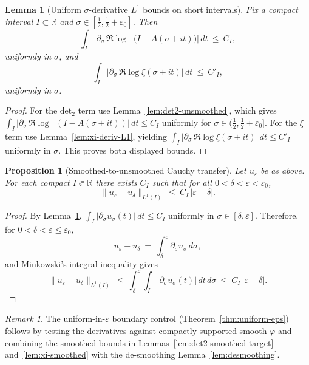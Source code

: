 \documentclass[11pt]{article}
\newtheorem{proposition}[theorem]{Proposition}
\newtheorem{lemma}[theorem]{Lemma}
\theoremstyle{definition}
\theoremstyle{remark}
\newtheorem{remark}[theorem]{Remark}
\newcommand{\R}{\mathbb{R}}
\DeclareMathOperator{\dettwo}{det_2}
\begin{document}
\begin{lemma}[Uniform \(\sigma\)-derivative $L^1$ bounds on short intervals]\label{lem:uniform-derivative-L1}
Fix a compact interval \(I\subset\R\) and \(\sigma\in[\tfrac12,\tfrac12+\varepsilon_0]\). Then
\[
 \int_I \Big|\partial_\sigma\,\Re\log\dettwo\big(I-A(\sigma+it)\big)\Big|\,dt\ \le\ C_I,
\]
uniformly in \(\sigma\), and
\[
 \int_I \Big|\partial_\sigma\,\Re\log\xi(\sigma+it)\Big|\,dt\ \le\ C'_I,
\]
uniformly in \(\sigma\).
\end{lemma}
\begin{proof}
For the det$_2$ term use Lemma~\ref{lem:det2-unsmoothed}, which gives
\(\int_I |\partial_\sigma\,\Re\log\dettwo(I-A(\sigma+it))|\,dt\le C_I\) uniformly for \(\sigma\in(\tfrac12,\tfrac12+\varepsilon_0]\).
For the \(\xi\) term use Lemma~\ref{lem:xi-deriv-L1}, yielding \(\int_I |\partial_\sigma\,\Re\log\xi(\sigma+it)|\,dt\le C'_I\) uniformly in \(\sigma\). This proves both displayed bounds.
\end{proof}

\begin{proposition}[Smoothed-to-unsmoothed Cauchy transfer]\label{prop:desmoothing}
Let \(u_\varepsilon\) be as above. For each compact \(I\Subset\R\) there exists \(C_I\) such that for all \(0<\delta<\varepsilon<\varepsilon_0\),
\[
 \|u_\varepsilon-u_\delta\|_{L^1(I)}\ \le\ C_I\,|\varepsilon-\delta|.
\]
\end{proposition}
\begin{proof}
By Lemma~\ref{lem:uniform-derivative-L1}, \(\int_I |\partial_\sigma u_\sigma(t)|\,dt\le C_I\) uniformly in \(\sigma\in[\delta,\varepsilon]\). Therefore, for \(0<\delta<\varepsilon\le\varepsilon_0\),
\[
 u_\varepsilon-u_\delta\ =\ \int_\delta^\varepsilon \partial_\sigma u_\sigma\,d\sigma,
\]
and Minkowski's integral inequality gives
\[
 \|u_\varepsilon-u_\delta\|_{L^1(I)}\ \le\ \int_\delta^\varepsilon\!\int_I |\partial_\sigma u_\sigma(t)|\,dt\,d\sigma\ \le\ C_I\,|\varepsilon-\delta|.
\]
\end{proof}

\begin{remark}
The uniform-in-\(\varepsilon\) boundary control (Theorem~\ref{thm:uniform-eps}) follows by testing the derivatives against compactly supported smooth \(\varphi\) and combining the smoothed bounds in Lemmas~\ref{lem:det2-smoothed-target} and~\ref{lem:xi-smoothed} with the de-smoothing Lemma~\ref{lem:desmoothing}.
\end{remark}
\end{document}
